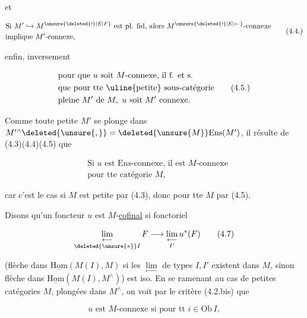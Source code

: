 
et

\[
\begin{aligned}
&\text{Si }M'\hookrightarrow M^{\unsure{\deleted{\prime}|E|F}}\text{ est pl. fid, alors }M^{\unsure{\deleted{\prime}|E|\leftarrow}}\text{-connexe}\\
&\text{implique }M'\text{-connexe,}
\end{aligned}\tag*{(4.4.)}
\]

enfin, inversement

\[
\begin{aligned}
&\text{pour que }u\text{ soit }M\text{-connexe, il f. et s.}\\
&\text{que pour tte \uline{petite} sous-catégorie}\\
&\text{pleine }M'\text{ de }M,\ u\text{ soit }M'\text{ connexe.}
\end{aligned}\tag*{(4.5.)}
\]

Comme toute petite $M'$ se plonge dans $M'{}^\wedge\deleted{\unsure{,}}=\deleted{\unsure{M}}\mathrm{Ens}(M')$, il résulte de  (4.3)(4.4)(4.5) que 

\[
\begin{aligned}
&\text{Si }u\text{ est Ens-connexe, il est }M\text{-connexe}\\
&\text{pour tte catégorie }M,
\end{aligned}\tag*{(4.6)}
\]

car c'est le cas si $M$ est petite par (4.3), donc pour tte $M$ par (4.5).

Disons qu'un foncteur $u$  est $M$-\uline{cofinal}  si    fonctoriel

\[
\underset{\deleted{\unsure{*}}I}{\underset{\longleftarrow}{\lim}}\,F\longrightarrow
\underset{I'}{\underset{\longleftarrow}{\lim}}\,u^*(F)\tag*{(4.7)}
\]

(flèche dans $\underline{\mathrm{Hom}}(M(I),M)$ si les $\underset{\longleftarrow}{\lim}$ de types $I,I'$ existent dans $M$, sinon flèche dans $\underline{\mathrm{Hom}}(M(I),M^\wedge)$) est  iso. En se ramenant au cas de petites catégories $M$,  plongées dans $M^\wedge$, on voit par le critère (4.2.bis) que

\[
u\text{ est }M\text{-connexe si pour tt }i\in\mathrm{Ob}\,I,\tag*{(4.8.)}
\]
